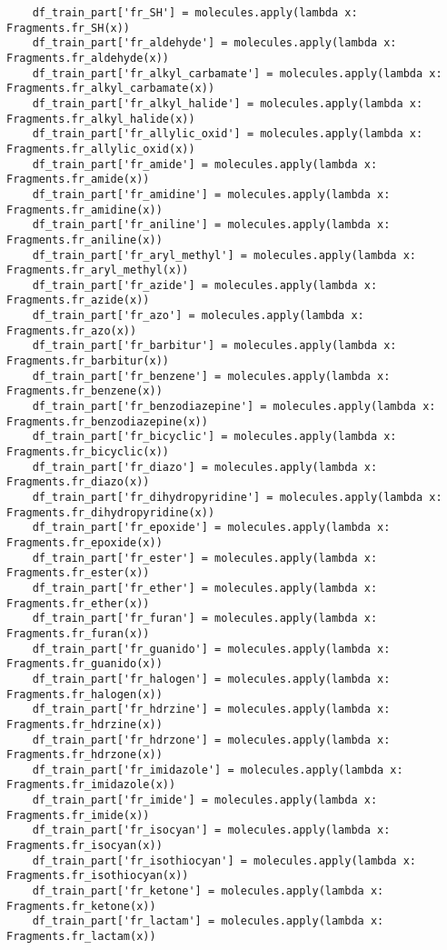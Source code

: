 \documentclass[11pt, oneside]{article}   	%
\begin{document}
\begin{lstlisting}
    df_train_part['fr_SH'] = molecules.apply(lambda x: Fragments.fr_SH(x))
    df_train_part['fr_aldehyde'] = molecules.apply(lambda x: Fragments.fr_aldehyde(x))
    df_train_part['fr_alkyl_carbamate'] = molecules.apply(lambda x: Fragments.fr_alkyl_carbamate(x))
    df_train_part['fr_alkyl_halide'] = molecules.apply(lambda x: Fragments.fr_alkyl_halide(x))
    df_train_part['fr_allylic_oxid'] = molecules.apply(lambda x: Fragments.fr_allylic_oxid(x))
    df_train_part['fr_amide'] = molecules.apply(lambda x: Fragments.fr_amide(x))
    df_train_part['fr_amidine'] = molecules.apply(lambda x: Fragments.fr_amidine(x))
    df_train_part['fr_aniline'] = molecules.apply(lambda x: Fragments.fr_aniline(x))
    df_train_part['fr_aryl_methyl'] = molecules.apply(lambda x: Fragments.fr_aryl_methyl(x))
    df_train_part['fr_azide'] = molecules.apply(lambda x: Fragments.fr_azide(x))
    df_train_part['fr_azo'] = molecules.apply(lambda x: Fragments.fr_azo(x))
    df_train_part['fr_barbitur'] = molecules.apply(lambda x: Fragments.fr_barbitur(x))
    df_train_part['fr_benzene'] = molecules.apply(lambda x: Fragments.fr_benzene(x))
    df_train_part['fr_benzodiazepine'] = molecules.apply(lambda x: Fragments.fr_benzodiazepine(x))
    df_train_part['fr_bicyclic'] = molecules.apply(lambda x: Fragments.fr_bicyclic(x))
    df_train_part['fr_diazo'] = molecules.apply(lambda x: Fragments.fr_diazo(x))
    df_train_part['fr_dihydropyridine'] = molecules.apply(lambda x: Fragments.fr_dihydropyridine(x))
    df_train_part['fr_epoxide'] = molecules.apply(lambda x: Fragments.fr_epoxide(x))
    df_train_part['fr_ester'] = molecules.apply(lambda x: Fragments.fr_ester(x))
    df_train_part['fr_ether'] = molecules.apply(lambda x: Fragments.fr_ether(x))
    df_train_part['fr_furan'] = molecules.apply(lambda x: Fragments.fr_furan(x))
    df_train_part['fr_guanido'] = molecules.apply(lambda x: Fragments.fr_guanido(x))
    df_train_part['fr_halogen'] = molecules.apply(lambda x: Fragments.fr_halogen(x))
    df_train_part['fr_hdrzine'] = molecules.apply(lambda x: Fragments.fr_hdrzine(x))
    df_train_part['fr_hdrzone'] = molecules.apply(lambda x: Fragments.fr_hdrzone(x))
    df_train_part['fr_imidazole'] = molecules.apply(lambda x: Fragments.fr_imidazole(x))
    df_train_part['fr_imide'] = molecules.apply(lambda x: Fragments.fr_imide(x))
    df_train_part['fr_isocyan'] = molecules.apply(lambda x: Fragments.fr_isocyan(x))
    df_train_part['fr_isothiocyan'] = molecules.apply(lambda x: Fragments.fr_isothiocyan(x))
    df_train_part['fr_ketone'] = molecules.apply(lambda x: Fragments.fr_ketone(x))
    df_train_part['fr_lactam'] = molecules.apply(lambda x: Fragments.fr_lactam(x))

\end{lstlisting}
\end{document}
